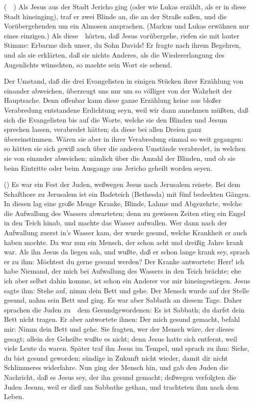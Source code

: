 \begin{aufza}
\item {} (\ \ ) Als Jesus aus der Stadt Jericho ging (oder wie Lukas erzählt, als er in diese Stadt hineinging), traf er zwei Blinde an, die an der Straße saßen, und die Vorübergehenden um ein Almosen ansprachen. (Markus und Lukas erwähnen nur eines einzigen.) Als diese~\ hörten, daß Jesus vorübergehe, riefen sie mit lauter Stimme: Erbarme dich unser, du Sohn Davids! Er fragte nach ihrem Begehren, und als sie erklärten, daß sie nichts Anderes, als die Wiedererlangung des Augenlichts wünschten, so machte sein Wort sie sehend.\par
Der Umstand, daß die drei Evangelisten in einigen Stücken ihrer Erzählung von einander abweichen, überzeugt uns nur um so völliger von der Wahrheit der Hauptsache. Denn offenbar kann diese ganze Erzählung keine aus bloßer Verabredung entstandene Erdichtung seyn, weil wir dann annehmen müßten, daß sich die Evangelisten bis auf die Worte, welche sie den Blinden und Jesum sprechen lassen, verabredet hätten; da diese bei allen Dreien ganz übereinstimmen. Wären sie aber in ihrer Verabredung einmal so weit gegangen: so hätten sie sich gewiß auch über die anderen Umstände verabredet, in welchen sie von einander abweichen; nämlich über die Anzahl der Blinden, und ob sie beim Eintritte oder beim Ausgange aus Jericho geheilt worden seyen. 
\item {} () Es war ein Fest der Juden, weßwegen Jesus nach Jerusalem reisete. Bei dem Schafthore zu Jerusalem ist ein Badeteich (Bethesda) mit fünf bedeckten Gängen. In diesen lag eine große Menge Kranke, Blinde, Lahme und Abgezehrte, welche die Aufwallung des Wassers abwarteten; denn zu gewissen Zeiten stieg ein Engel in den Teich hinab, und machte das Wasser aufwallen. Wer dann nach der Aufwallung zuerst in's Wasser kam, der wurde gesund, welche Krankheit er auch haben mochte. Da war nun ein Mensch, der schon acht und dreißig Jahre krank war. Als ihn Jesus da liegen sah, und wußte, daß er schon lange krank sey, sprach er zu ihm: Möchtest du gerne gesund werden? Der Kranke antwortete: Herr! ich habe Niemand, der mich bei Aufwallung des Wassers in den Teich brächte; ehe ich aber selbst dahin komme, ist schon ein Anderer vor mir hineingestiegen. Jesus sagte ihm: Stehe auf, nimm dein Bett und gehe. Der Mensch wurde auf der Stelle gesund, nahm sein Bett und ging. Es war aber Sabbath an diesem Tage. Daher sprachen die Juden zu~\ dem Gesundgewordenen: Es ist Sabbath; du darfst dein Bett nicht tragen. Er aber antwortete ihnen: Der mich gesund gemacht, befahl mir: Nimm dein Bett und gehe. Sie fragten, wer der Mensch wäre, der dieses gesagt; allein der Geheilte wußte es nicht; denn Jesus hatte sich entfernt, weil viele Leute da waren. Später traf ihn Jesus im Tempel, und sprach zu ihm: Siehe, du bist gesund geworden; sündige in Zukunft nicht wieder, damit dir nicht Schlimmeres widerfahre. Nun ging der Mensch hin, und gab den Juden die Nachricht, daß es Jesus sey, der ihn gesund gemacht; deßwegen verfolgten die Juden Jesum, weil er dieß am Sabbathe gethan, und trachteten ihm nach dem Leben. 

\end{aufza}
